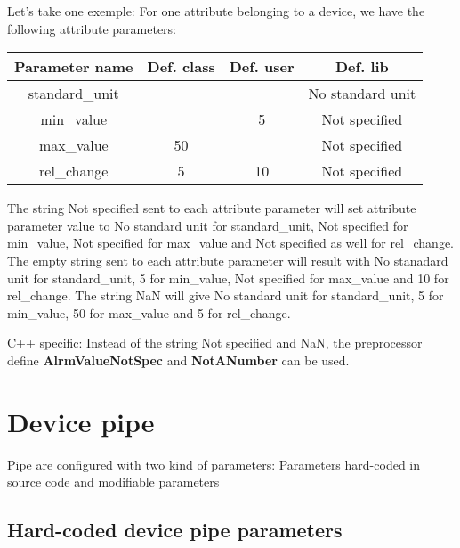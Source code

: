 \vspace{0.3cm}

\begin{center}
Let's take one exemple: For one attribute belonging to a device, we
have the following attribute parameters:\vspace{0.3cm}
\begin{longtable}{|c|c|c|c|}
\hline 
Parameter name & Def. class & Def. user & Def. lib\tabularnewline
\hline 
\hline 
standard\_unit &  &  & No standard unit\tabularnewline
\hline 
min\_value &  & 5 & Not specified\tabularnewline
\hline 
max\_value & 50 &  & Not specified\tabularnewline
\hline 
rel\_change & 5 & 10 & Not specified\tabularnewline
\hline 
\end{longtable}
\par\end{center}

\vspace{0.3cm}

The string \textquotedbl{}Not specified\textquotedbl{} sent to each
attribute parameter will set attribute parameter value to \textquotedbl{}No
standard unit\textquotedbl{} for standard\_unit, \textquotedbl{}Not
specified\textquotedbl{} for min\_value, \textquotedbl{}Not specified\textquotedbl{}
for max\_value and \textquotedbl{}Not specified\textquotedbl{} as
well for rel\_change. The empty string sent to each attribute parameter
will result with \textquotedbl{}No stanadard unit\textquotedbl{} for
standard\_unit, 5 for min\_value, \textquotedbl{}Not specified\textquotedbl{}
for max\_value and 10 for rel\_change. The string \textquotedbl{}NaN\textquotedbl{}
will give \textquotedbl{}No standard unit\textquotedbl{} for standard\_unit,
5 for min\_value, 50 for max\_value and 5 for rel\_change.

C++ specific: Instead of the string \textquotedbl{}Not specified\textquotedbl{}
and \textquotedbl{}NaN\textquotedbl{}, the preprocessor define\textbf{
AlrmValueNotSpec} and \textbf{NotANumber} can be used.

\section{Device pipe}

Pipe are configured with two kind of parameters: Parameters hard-coded
in source code and modifiable parameters

\subsection{Hard-coded device pipe parameters}

